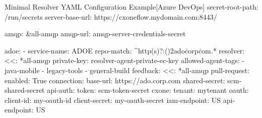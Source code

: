 \begin{code}{Minimal Resolver YAML Configuration Example}{[Azure DevOps]}{}
  secret-root-path: /run/secrets
  server-base-url: https://cxoneflow.mydomain.com:8443/

  amqp: &all-amqp
    amqp-url: amqp-server-credentials-secret

  adoe:
      - service-name: ADOE
        repo-match: ^http(s)?:(\/){2}ado\.corp\.com.*
        resolver:
          <<: *all-amqp
          private-key: resolver-agent-private-ec-key
          allowed-agent-tags:
            - java-mobile
            - legacy-tools
            - general-build
        feedback:
          <<: *all-amqp
          pull-request:
            enabled: True
        connection:
          base-url: https://ado.corp.com
          shared-secret: scm-shared-secret
          api-auth:
            token: scm-token-secret
        cxone:
          tenant: mytenant
          oauth:
            client-id: my-oauth-id
            client-secret: my-oauth-secret
          iam-endpoint: US
          api-endpoint: US
\end{code}
